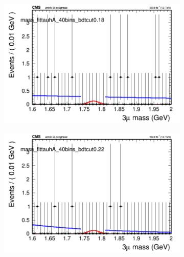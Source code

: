 \begin{figure}[H]
\begin{subfigure}{0.2\textwidth}
        \caption{}
    \end{subfigure}
    \begin{subfigure}{0.2\textwidth}
        \includegraphics[width=\textwidth]{unfixed_exp/plots/tauhA/massfit_tauhA_40bins_bdtcut0.18.png}
        \caption{}
    \end{subfigure}
    \begin{subfigure}{0.2\textwidth}
        \includegraphics[width=\textwidth]{unfixed_exp/plots/tauhA/massfit_tauhA_40bins_bdtcut0.22.png}
        \caption{}
    \end{subfigure}
    \begin{subfigure}{0.2\textwidth}

\end{subfigure}
\end{figure}
